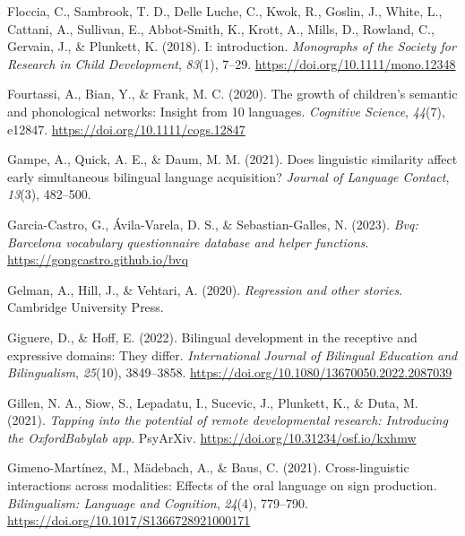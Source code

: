 \documentclass[
]{article}
\newlength{\cslhangindent}
\newlength{\cslentryspacingunit} %
\newenvironment{CSLReferences}[2] %
 {%
  \setlength{\parindent}{0pt}
  \ifodd #1
  \let\oldpar\par
  \def\par{\hangindent=\cslhangindent\oldpar}
  \fi
  \setlength{\parskip}{#2\cslentryspacingunit}
 }%
 {}
\begin{document}
\begin{CSLReferences}{1}{0}
\leavevmode{}%
Floccia, C., Sambrook, T. D., Delle Luche, C., Kwok, R., Goslin, J.,
White, L., Cattani, A., Sullivan, E., Abbot‐Smith, K., Krott, A., Mills,
D., Rowland, C., Gervain, J., \& Plunkett, K. (2018). I: introduction.
\emph{Monographs of the Society for Research in Child Development},
\emph{83}(1), 7--29. \url{https://doi.org/10.1111/mono.12348}

\leavevmode{}%
Fourtassi, A., Bian, Y., \& Frank, M. C. (2020). The growth of
children's semantic and phonological networks: Insight from 10
languages. \emph{Cognitive Science}, \emph{44}(7), e12847.
\url{https://doi.org/10.1111/cogs.12847}

\leavevmode{}%
Gampe, A., Quick, A. E., \& Daum, M. M. (2021). Does linguistic
similarity affect early simultaneous bilingual language acquisition?
\emph{Journal of Language Contact}, \emph{13}(3), 482--500.

\leavevmode{}%
Garcia-Castro, G., Ávila-Varela, D. S., \& Sebastian-Galles, N. (2023).
\emph{Bvq: Barcelona vocabulary questionnaire database and helper
functions}. \url{https://gongcastro.github.io/bvq}

\leavevmode{}%
Gelman, A., Hill, J., \& Vehtari, A. (2020). \emph{Regression and other
stories}. Cambridge University Press.

\leavevmode{}%
Giguere, D., \& Hoff, E. (2022). Bilingual development in the receptive
and expressive domains: They differ. \emph{International Journal of
Bilingual Education and Bilingualism}, \emph{25}(10), 3849--3858.
\url{https://doi.org/10.1080/13670050.2022.2087039}

\leavevmode{}%
Gillen, N. A., Siow, S., Lepadatu, I., Sucevic, J., Plunkett, K., \&
Duta, M. (2021). \emph{Tapping into the potential of remote
developmental research: Introducing the {OxfordBabylab} app}.
{PsyArXiv}. \url{https://doi.org/10.31234/osf.io/kxhmw}

\leavevmode{}%
Gimeno-Martínez, M., Mädebach, A., \& Baus, C. (2021). Cross-linguistic
interactions across modalities: Effects of the oral language on sign
production. \emph{Bilingualism: Language and Cognition}, \emph{24}(4),
779--790. \url{https://doi.org/10.1017/S1366728921000171}


\end{CSLReferences}
\end{document}
